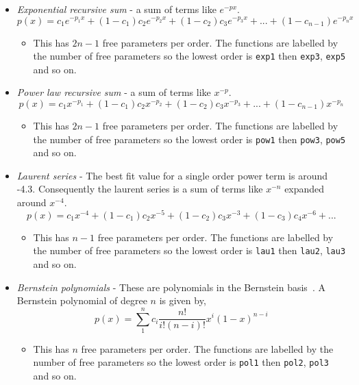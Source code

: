\begin{itemize}
  \item \textit{Exponential recursive sum} - a sum of terms like $e^{-px}$.
    \begin{equation}
      p(x) = c_{1}e^{-p_{1}x} + (1-c_{1})c_{2}e^{-p_{2}x} + (1-c_{2})c_{3}e^{-p_{3}x} + ... + (1-c_{n-1})e^{-p_{n}x}
    \end{equation}
    \begin{itemize}
      \item This has $2n-1$ free parameters per order. The functions are labelled by the number of free parameters so the lowest order is \texttt{exp1} then \texttt{exp3}, \texttt{exp5} and so on.
    \end{itemize}

  \item \textit{Power law recursive sum} - a sum of terms like $x^{-p}$.
    \begin{equation}
      p(x) = c_{1}x^{-p_{1}} + (1-c_{1})c_{2}x^{-p_{2}} + (1-c_{2})c_{3}x^{-p_{3}} + ... + (1-c_{n-1})x^{-p_{n}}
    \end{equation}
    \begin{itemize}
      \item This has $2n-1$ free parameters per order. The functions are labelled by the number of free parameters so the lowest order is \texttt{pow1} then \texttt{pow3}, \texttt{pow5} and so on.
    \end{itemize}

  \item \textit{Laurent series} - The best fit value for a single order power term is around -4.3. Consequently the laurent series is a sum of terms like $x^{-n}$ expanded around $x^{-4}$.
    \begin{equation}
      p(x) = c_{1}x^{-4} + (1-c_{1})c_{2}x^{-5} + (1-c_{2})c_{3}x^{-3} + (1-c_{3})c_{4}x^{-6} + ...
    \end{equation}
    \begin{itemize}
      \item This has $n-1$ free parameters per order. The functions are labelled by the number of free parameters so the lowest order is \texttt{lau1} then \texttt{lau2}, \texttt{lau3} and so on.
    \end{itemize}

  \item \textit{Bernstein polynomials} - These are polynomials in the Bernstein basis~\cite{bernsteins1,bernsteins2}. A Bernstein polynomial of degree $n$ is given by,
  \begin{equation}
    p(x) = \displaystyle\sum_{1}^{n}c_{i}\frac{n!}{i!(n-i)!}x^{i}(1-x)^{n-i}
    \label{eq:bernsteins}
  \end{equation}
  \begin{itemize}
    \item This has $n$ free parameters per order. The functions are labelled by the number of free parameters so the lowest order is \texttt{pol1} then \texttt{pol2}, \texttt{pol3} and so on.
  \end{itemize}
\end{itemize}

